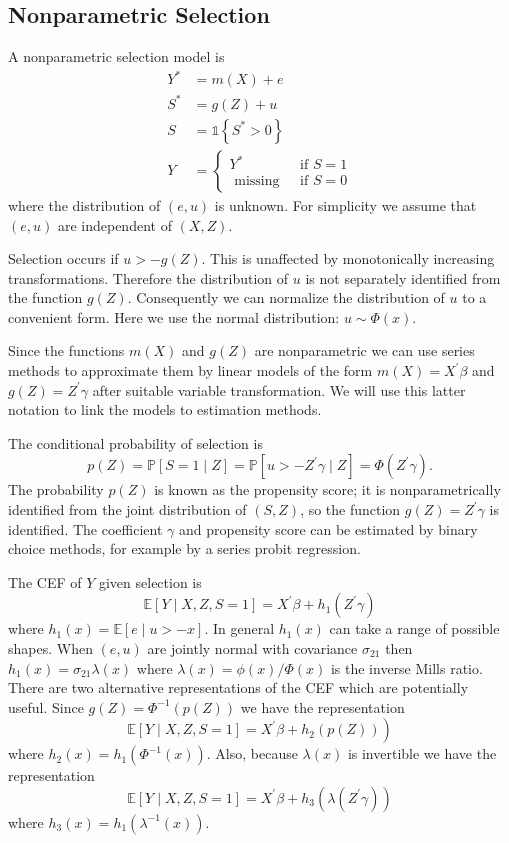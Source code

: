 \documentclass[10pt]{article}
\begin{document}
\subsection{Nonparametric Selection}
A nonparametric selection model is
$$
\begin{aligned}
Y^{*} &=m(X)+e \\
S^{*} &=g(Z)+u \\
S &=\mathbb{1}\left\{S^{*}>0\right\} \\
Y &=\left\{\begin{array}{cc}
Y^{*} & \text { if } S=1 \\
\text { missing } & \text { if } S=0
\end{array}\right.
\end{aligned}
$$
where the distribution of $(e, u)$ is unknown. For simplicity we assume that $(e, u)$ are independent of $(X, Z)$.

Selection occurs if $u>-g(Z)$. This is unaffected by monotonically increasing transformations. Therefore the distribution of $u$ is not separately identified from the function $g(Z)$. Consequently we can normalize the distribution of $u$ to a convenient form. Here we use the normal distribution: $u \sim \Phi(x)$.

Since the functions $m(X)$ and $g(Z)$ are nonparametric we can use series methods to approximate them by linear models of the form $m(X)=X^{\prime} \beta$ and $g(Z)=Z^{\prime} \gamma$ after suitable variable transformation. We will use this latter notation to link the models to estimation methods.

The conditional probability of selection is
$$
p(Z)=\mathbb{P}[S=1 \mid Z]=\mathbb{P}\left[u>-Z^{\prime} \gamma \mid Z\right]=\Phi\left(Z^{\prime} \gamma\right) .
$$
The probability $p(Z)$ is known as the propensity score; it is nonparametrically identified from the joint distribution of $(S, Z)$, so the function $g(Z)=Z^{\prime} \gamma$ is identified. The coefficient $\gamma$ and propensity score can be estimated by binary choice methods, for example by a series probit regression.

The CEF of $Y$ given selection is
$$
\mathbb{E}[Y \mid X, Z, S=1]=X^{\prime} \beta+h_{1}\left(Z^{\prime} \gamma\right)
$$
where $h_{1}(x)=\mathbb{E}[e \mid u>-x]$. In general $h_{1}(x)$ can take a range of possible shapes. When $(e, u)$ are jointly normal with covariance $\sigma_{21}$ then $h_{1}(x)=\sigma_{21} \lambda(x)$ where $\lambda(x)=\phi(x) / \Phi(x)$ is the inverse Mills ratio. There are two alternative representations of the CEF which are potentially useful. Since $g(Z)=\Phi^{-1}(p(Z))$ we have the representation
$$
\left.\mathbb{E}[Y \mid X, Z, S=1]=X^{\prime} \beta+h_{2}(p(Z))\right)
$$
where $h_{2}(x)=h_{1}\left(\Phi^{-1}(x)\right)$. Also, because $\lambda(x)$ is invertible we have the representation
$$
\mathbb{E}[Y \mid X, Z, S=1]=X^{\prime} \beta+h_{3}\left(\lambda\left(Z^{\prime} \gamma\right)\right)
$$
where $h_{3}(x)=h_{1}\left(\lambda^{-1}(x)\right)$.
\end{document}

